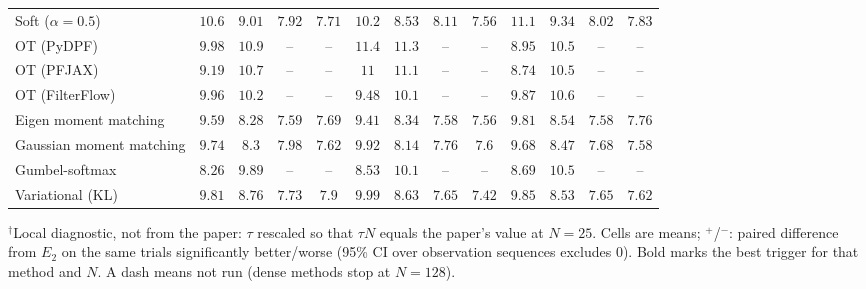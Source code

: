 \begin{table}[ht]
\begin{adjustbox}{max width=\linewidth}
\begin{tabular}{lcccc|cccc|cccc}
Soft ($\alpha{=}0.5$) & $10.6$ & $9.01$ & $\mathbf{7.92}$ & $7.71$ & $\mathbf{10.2}$ & $\mathbf{8.53}$ & $8.11$ & $\mathbf{7.56}$ & $11.1$ & $9.34$ & $8.02$ & $7.83$ \\
OT (PyDPF) & $9.98$ & $10.9$ & -- & -- & $11.4$ & $11.3$ & -- & -- & $\mathbf{8.95}$ & $\mathbf{10.5}$ & -- & -- \\
OT (PFJAX) & $9.19$ & $10.7$ & -- & -- & $11$ & $11.1$ & -- & -- & $\mathbf{8.74}$ & $\mathbf{10.5}$ & -- & -- \\
OT (FilterFlow) & $9.96$ & $10.2$ & -- & -- & $\mathbf{9.48}$ & $\mathbf{10.1}$ & -- & -- & $9.87$ & $10.6$ & -- & -- \\
Eigen moment matching & $9.59$ & $\mathbf{8.28}$ & $7.59$ & $7.69$ & $\mathbf{9.41}$ & $8.34$ & $7.58$ & $\mathbf{7.56}$ & $9.81$ & $8.54$ & $\mathbf{7.58}$ & $7.76$ \\
Gaussian moment matching & $9.74$ & $8.3$ & $7.98$ & $7.62$ & $9.92$ & $\mathbf{8.14}$ & $7.76$ & $7.6$ & $\mathbf{9.68}$ & $8.47$ & $\mathbf{7.68}$ & $\mathbf{7.58}$ \\
Gumbel-softmax & $\mathbf{8.26}$ & $\mathbf{9.89}$ & -- & -- & $8.53$ & $10.1$ & -- & -- & $8.69$ & $10.5$ & -- & -- \\
Variational (KL) & $\mathbf{9.81}$ & $8.76$ & $7.73$ & $7.9$ & $9.99$ & $8.63$ & $7.65$ & $\mathbf{7.42}$ & $9.85$ & $\mathbf{8.53}$ & $\mathbf{7.65}$ & $7.62$ \\
\bottomrule
\end{tabular}
\end{adjustbox}
\par\smallskip\parbox{0.95\linewidth}{\footnotesize $^\dagger$Local diagnostic, not from the paper: $\tau$ rescaled so that $\tau N$ equals the paper's value at $N{=}25$. Cells are means; $^{+}$/$^{-}$: paired difference from $E_2$ on the same trials significantly better/worse (95\% CI over observation sequences excludes 0). Bold marks the best trigger for that method and $N$. A dash means not run (dense methods stop at $N{=}128$).}
\end{table}

